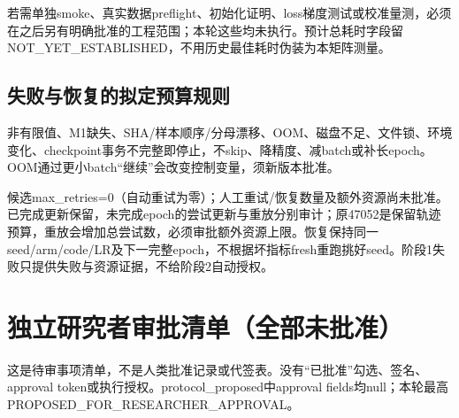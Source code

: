 \documentclass[UTF8,fontset=fandol,10pt]{ctexart}
\begin{document}
若需单独smoke、真实数据preflight、初始化证明、loss梯度测试或校准量测，必须在之后另有明确批准的工程范围；本轮这些均未执行。预计总耗时字段留NOT\_\allowbreak{}YET\_\allowbreak{}ESTABLISHED，不用历史最佳耗时伪装为本矩阵测量。

\subsection{失败与恢复的拟定预算规则}

非有限值、M1缺失、SHA/\allowbreak{}样本顺序/\allowbreak{}分母漂移、OOM、磁盘不足、文件锁、环境变化、checkpoint事务不完整即停止，不skip、降精度、减batch或补长epoch。OOM通过更小batch“继续”会改变控制变量，须新版本批准。

候选max\_\allowbreak{}retries=0（自动重试为零）；人工重试/\allowbreak{}恢复数量及额外资源尚未批准。已完成更新保留，未完成epoch的尝试更新与重放分别审计；原47052是保留轨迹预算，重放会增加总尝试数，必须审批额外资源上限。恢复保持同一seed/\allowbreak{}arm/\allowbreak{}code/\allowbreak{}LR及下一完整epoch，不根据坏指标fresh重跑挑好seed。阶段1失败只提供失败与资源证据，不给阶段2自动授权。
\clearpage\section{独立研究者审批清单（全部未批准）}

这是待审事项清单，不是人类批准记录或代签表。没有“已批准”勾选、签名、approval token或执行授权。protocol\_\allowbreak{}proposed中approval fields均null；本轮最高PROPOSED\_\allowbreak{}FOR\_\allowbreak{}RESEARCHER\_\allowbreak{}APPROVAL。
\end{document}
